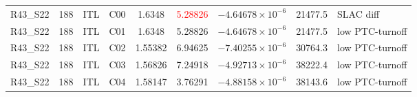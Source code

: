 \begin{landscape}
\begin{table}[!htb]
\begin{tabular}{ccccccccp{}}
    R43\_S22       &            188 & ITL      & C00  &      1.6348               & \textcolor{red}{5.28826} &  $-4.64678 \times 10^{-6}$                 & 21477.5   & SLAC diff\\
    R43\_S22       &            188 & ITL      & C01  &      1.6348               &      5.28826             &  $-4.64678 \times 10^{-6}$                 & 21477.5   & low PTC-turnoff\\
    R43\_S22       &            188 & ITL      & C02  &      1.55382              &      6.94625             &  $-7.40255 \times 10^{-6}$                 & 30764.3   & low PTC-turnoff\\
    R43\_S22       &            188 & ITL      & C03  &      1.56826              &      7.24918             &  $-4.92713 \times 10^{-6}$                 & 38222.4   & low PTC-turnoff\\
    R43\_S22       &            188 & ITL      & C04  &      1.58147              &      3.76291             &  $-4.88158 \times 10^{-6}$                 & 38143.6   & low PTC-turnoff\\
    \hline
    \end{tabular}
\end{table}
\end{landscape}